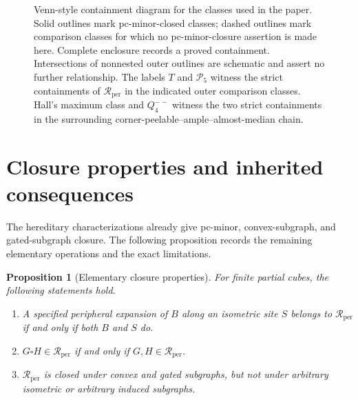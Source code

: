 \documentclass[11pt]{article}
\newtheorem{proposition}[theorem]{Proposition}
\theoremstyle{definition}
\theoremstyle{remark}
\newcommand{\Rper}{\mathcal R_{\mathrm{per}}}
\begin{document}
\begin{figure}[htbp]
\caption{Venn-style containment diagram for the classes used in the paper.
Solid outlines mark pc-minor-closed classes; dashed outlines mark comparison
classes for which no pc-minor-closure assertion is made here.  Complete
enclosure records a proved containment.  Intersections of nonnested outer
outlines are schematic and assert no further relationship.  The labels
\(T\) and \(\mathcal P_5\) witness the strict containments of \(\Rper\) in
the indicated outer comparison classes.  Hall's maximum class and
\(Q_4^{--}\) witness the two strict containments in the surrounding
corner-peelable--ample--almost-median chain.}
\label{fig:class-position}
\end{figure}

\section{Closure properties and inherited consequences}
\label{sec:closure}

The hereditary characterizations already give pc-minor, convex-subgraph,
and gated-subgraph closure.  The following proposition records the remaining
elementary operations and the exact limitations.

\begin{proposition}[Elementary closure properties]
\label{prop:closure}
For finite partial cubes, the following statements hold.
\begin{enumerate}[label=\textup{(\roman*)}]
  \item A specified peripheral expansion of \(B\) along an isometric site
        \(S\) belongs to \(\Rper\) if and only if both \(B\) and \(S\) do.
  \item \(G\square H\in\Rper\) if and only if \(G,H\in\Rper\).
  \item \(\Rper\) is closed under convex and gated subgraphs, but not under
        arbitrary isometric or arbitrary induced subgraphs.
\end{enumerate}
\end{proposition}
\end{document}
